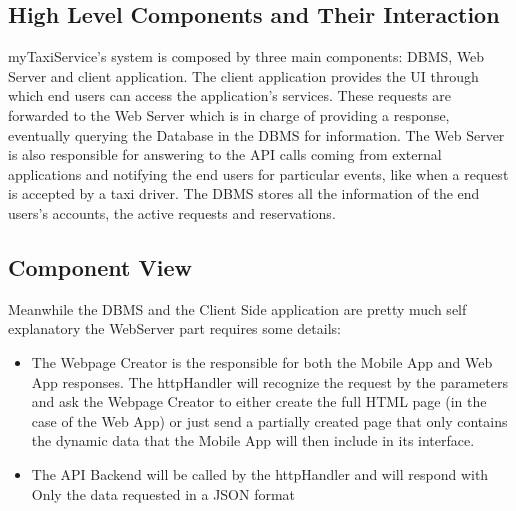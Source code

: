 \documentclass{article}
\begin{document}
\subsection{High Level Components and Their Interaction}
myTaxiService's system is composed by three main components: DBMS, Web Server and client application. The client application provides the UI through which end users can access the application's services. These requests are forwarded to the Web Server which is in charge of providing a response, eventually querying the Database in the DBMS for information. The Web Server is also responsible for answering to the API calls coming from external applications and notifying the end users for particular events, like when a request is accepted by a taxi driver. The DBMS stores all the information of the end users's accounts, the active requests and reservations. %
\subsection{Component View}
\begin{figure}[H]
\end{figure}
	  Meanwhile the DBMS and the Client Side application are pretty much self explanatory the WebServer part requires some details:
	  \begin{itemize}
			  \item The Webpage Creator is the responsible for both the Mobile App and Web App responses. The httpHandler will recognize the request by the parameters and ask the Webpage Creator to either create the full HTML page (in the case of the Web App) or just send a partially created page that only contains the dynamic data that the Mobile App will then include in its interface.
			  \item The API Backend will be called by the httpHandler and will respond with Only the data requested in a JSON format
	  \end{itemize}
\end{document}
